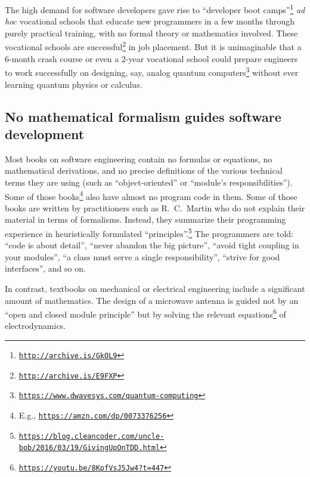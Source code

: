 The high demand for software developers gave rise to \textsf{``}developer
boot camps\textsf{''}\footnote{\texttt{\href{http://archive.is/GkOL9}{http://archive.is/GkOL9}}}
\textemdash{} \emph{ad hoc} vocational schools that educate new programmers
in a few months through purely practical training, with no formal
theory or mathematics involved. These vocational schools are successful\footnote{\texttt{\href{http://archive.is/E9FXP}{http://archive.is/E9FXP}}}
in job placement. But it is unimaginable that a $6$-month crash course
or even a $2$-year vocational school could prepare engineers to work
successfully on designing, say, analog quantum computers\footnote{\texttt{\href{https://www.dwavesys.com/quantum-computing}{https://www.dwavesys.com/quantum-computing}}}
without ever learning quantum physics or calculus.

\subsection*{No mathematical formalism guides software development}

Most books on software engineering contain no formulas or equations,
no mathematical derivations, and no precise definitions of the various
technical terms they are using (such as \textsf{``}object-oriented\textsf{''} or \textsf{``}module\textsf{'}s
responsibilities\textsf{''}). Some of those books\footnote{E.g., \texttt{\href{https://amzn.com/dp/0073376256}{https://amzn.com/dp/0073376256}}}
also have almost no program code in them. Some of those books are
written by practitioners such as R.\ C.\ Martin who do not explain
their material in terms of formalisms. Instead, they summarize their
programming experience in heuristically formulated \textquotedblleft principles\textquotedblright .\footnote{\texttt{\href{https://blog.cleancoder.com/uncle-bob/2016/03/19/GivingUpOnTDD.html}{https://blog.cleancoder.com/uncle-bob/2016/03/19/GivingUpOnTDD.html}}}
The programmers are told: \textsf{``}code is about detail\textsf{''}, \textsf{``}never abandon
the big picture\textsf{''}, \textsf{``}avoid tight coupling in your modules\textsf{''}, \textsf{``}a
class must serve a single responsibility\textsf{''}, \textsf{``}strive for good interfaces\textsf{''},
and so on. 

In contrast, textbooks on mechanical or electrical engineering include
a significant amount of mathematics. The design of a microwave antenna
is guided not by an \textsf{``}open and closed module principle\textsf{''} but by
solving the relevant  equations\footnote{\texttt{\href{https://youtu.be/8KpfVsJ5Jw4?t=447}{https://youtu.be/8KpfVsJ5Jw4?t=447}}}
of electrodynamics.

